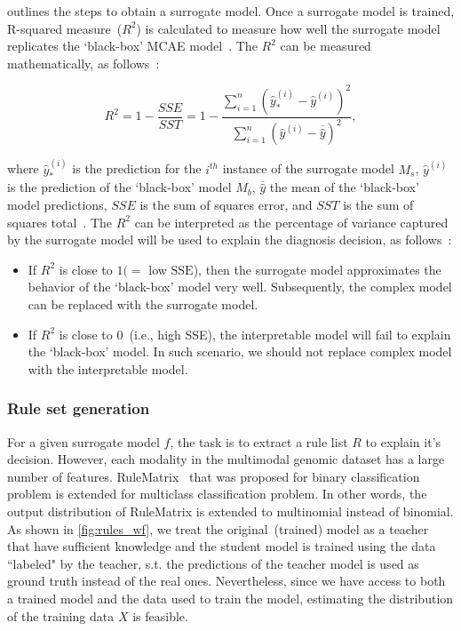 \hspace*{3.5mm}  outlines the steps to obtain a surrogate model. Once a surrogate model is trained, R-squared measure~($R^2$) is calculated to measure how well the surrogate model replicates the `black-box' MCAE model~\cite{molnar2019interpretable}. The $R^2$ can be measured mathematically, as follows~\cite{molnar2019interpretable}: 

\begin{equation}
    R^{2}=1-\frac{SSE}{SST}=1-\frac{\sum_{i=1}^{n}\left(\hat{y}_{*}^{(i)}-\hat{y}^{(i)}\right)^{2}}{\sum_{i=1}^{n}\left(\hat{y}^{(i)}-\overline{\hat{y}}\right)^{2}},
    \label{ew:r_squared}
\end{equation}

\hspace*{3.5mm} where $\hat{y}_{*}^{(i)}$ is the prediction for the $i^{th}$ instance of the surrogate model $M_s$, $\hat{y}^{(i)}$ is the prediction of the `black-box' model $M_b$, $\overline{\hat{y}}$ the mean of the `black-box' model predictions, $SSE$ is the sum of squares error, and $SST$ is the sum of squares total~\cite{molnar2019interpretable}. The $R^2$ can be interpreted as the percentage of variance captured by the surrogate model will be used to explain the diagnosis decision, as follows~\cite{molnar2019interpretable}:

\begin{itemize}[noitemsep]
    \item If $R^2$ is close to $1(=$ low $\mathrm{SSE}$), then the surrogate model approximates the behavior of the `black-box' model very well. Subsequently, the complex model can be replaced with the surrogate model. 
    \item If $R^2$ is close to 0~(i.e., high SSE), the interpretable model will fail to explain the `black-box' model. In such scenario, we should not replace  complex model with the interpretable model.
\end{itemize}

\subsubsection{Rule set generation}
For a given surrogate model ${f}$, the task is to extract a rule list $R$ to explain it's decision. However, each modality in the multimodal genomic dataset has a large number of features. RuleMatrix~\cite{ming2018rulematrix} that was proposed for binary classification problem is extended for multiclass classification problem. In other words, the output distribution of RuleMatrix is extended to multinomial instead of binomial. 
As shown in \cref{fig:rules_wf}, we treat the original~(trained) model as a teacher that have sufficient knowledge and the student model is trained using the data ``labeled" by the teacher, s.t. the predictions of the teacher model is used as ground truth instead of the real ones. Nevertheless, since we have access to both a trained model and the data used to train the model, estimating the distribution of the training data ${X}$ is feasible. 

